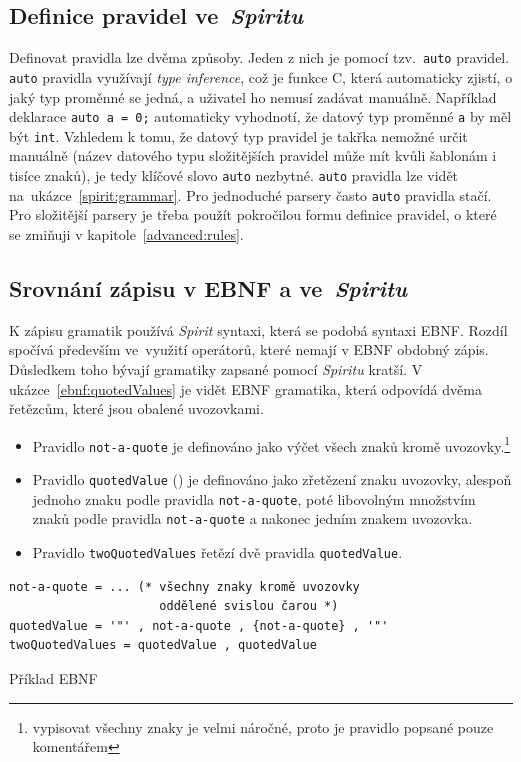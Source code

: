 \documentclass[thesis=B,czech,hidelinks]{FITthesis}[2019/03/06]
\newcommand{\Rplus}{\protect\hspace{-.1em}\protect\raisebox{.35ex}{\smaller{\smaller\textbf{+}}}}
\newcommand{\Cpp}{\mbox{C\Rplus\Rplus}\xspace}
\begin{document}
\subsection{Definice pravidel ve~\textit{Spiritu}}
Definovat pravidla lze dvěma způsoby. Jeden z nich je pomocí tzv.\ \texttt{auto} pravidel. \texttt{auto} pravidla využívají \textit{type inference}, což je funkce \Cpp{}, která automaticky zjistí, o jaký typ proměnné se jedná, a uživatel ho nemusí zadávat manuálně. Například deklarace \verb¨auto a = 0;¨ automaticky vyhodnotí, že datový typ proměnné \texttt{a} by měl být \texttt{int}. Vzhledem k tomu, že datový typ pravidel je takřka nemožné určit manuálně (název datového typu složitějších pravidel může mít kvůli šablonám i tisíce znaků), je tedy klíčové slovo \texttt{auto} nezbytné. \texttt{auto} pravidla lze vidět na~ukázce~\ref{spirit:grammar}. Pro jednoduché parsery často \texttt{auto} pravidla stačí. Pro složitější parsery je třeba použít pokročilou formu definice pravidel, o které se zmiňuji v kapitole~\ref{advanced:rules}.

\subsection{Srovnání zápisu v EBNF a ve~\textit{Spiritu}}
K zápisu gramatik používá \textit{Spirit} syntaxi, která se podobá syntaxi EBNF\@. Rozdíl spočívá především ve~využití operátorů, které nemají v EBNF obdobný zápis. Důsledkem toho bývají gramatiky zapsané pomocí \textit{Spiritu} kratší. V ukázce~\ref{ebnf:quotedValues} je vidět EBNF gramatika, která odpovídá dvěma řetězcům, které jsou obalené uvozovkami.

\begin{itemize}
    \item Pravidlo \texttt{not-a-quote} je definováno jako výčet všech znaků kromě uvozovky.\footnote{vypisovat všechny znaky je velmi náročné, proto je pravidlo popsané pouze komentářem}
    \item Pravidlo \texttt{quotedValue} () je definováno jako zřetězení znaku uvozovky, alespoň jednoho znaku podle pravidla \texttt{not-a-quote}, poté libovolným množstvím znaků podle pravidla \texttt{not-a-quote} a nakonec jedním znakem uvozovka.
    \item Pravidlo \texttt{twoQuotedValues} řetězí dvě pravidla \texttt{quotedValue}.
\end{itemize}

\begin{listing}[H]
\begin{verbatim}
not-a-quote = ... (* všechny znaky kromě uvozovky
                     oddělené svislou čarou *)
quotedValue = '"' , not-a-quote , {not-a-quote} , '"'
twoQuotedValues = quotedValue , quotedValue
\end{verbatim}
\caption{Příklad EBNF}\label{ebnf:quotedValues}
\end{listing}
\end{document}

